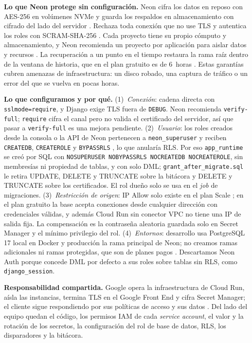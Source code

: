 \documentclass[10pt,letterpaper]{article}
\newcommand{\cod}[1]{\texttt{#1}}
\begin{document}
\textbf{Lo que Neon protege sin configuración.} Neon cifra los datos en reposo con AES-256 en volúmenes NVMe y guarda los respaldos en almacenamiento con cifrado del lado del servidor \cite{neon-security}. Rechaza toda conexión que no use TLS y autentica los roles con SCRAM-SHA-256 \cite{neon-connect}. Cada proyecto tiene su propio cómputo y almacenamiento, y Neon recomienda un proyecto por aplicación para aislar datos y recursos \cite{neon-plans}. La recuperación a un punto en el tiempo restaura la rama raíz dentro de la ventana de historia, que en el plan gratuito es de 6~horas \cite{neon-restore,neon-plans}. Estas garantías cubren amenazas de infraestructura: un disco robado, una captura de tráfico o un error del que se vuelva en pocas horas.

\textbf{Lo que configuramos y por qué.} (1)~\emph{Conexión}: cadena directa con \cod{sslmode=require}, y Django exige TLS fuera de \cod{DEBUG}. Neon recomienda \cod{verify-full}; \cod{require} cifra el canal pero no valida el certificado del servidor, así que pasar a \cod{verify-full} es una mejora pendiente. (2)~\emph{Usuario}: los roles creados desde la consola o la API de Neon pertenecen a \cod{neon\_superuser} y reciben \cod{CREATEDB}, \cod{CREATEROLE} y \cod{BYPASSRLS} \cite{neon-roles}, lo que anularía RLS. Por eso \cod{app\_runtime} se creó por SQL con \cod{NOSUPERUSER NOBYPASSRLS NOCREATEDB NOCREATEROLE}, sin membresías ni propiedad de tablas, y con solo DML; \cod{grant\_after\_migrate.sql} le retira UPDATE, DELETE y TRUNCATE sobre la bitácora y DELETE y TRUNCATE sobre los certificados. El rol dueño solo se usa en el \emph{job} de migraciones. (3)~\emph{Restricción de origen}: IP Allow solo existe en el plan Scale \cite{neon-ip}; en el plan gratuito la base acepta conexiones desde cualquier dirección con credenciales válidas, y además Cloud Run sin conector VPC no tiene una IP de salida fija. La compensación es la contraseña aleatoria guardada solo en Secret Manager y el mínimo privilegio del rol. (4)~\emph{Entornos}: desarrollo usa PostgreSQL 17 local en Docker y producción la rama principal de Neon; no creamos ramas adicionales ni ramas protegidas, que son de planes pagos \cite{neon-security}. Descartamos Neon Auth porque concede DML por defecto a sus roles sobre tablas sin RLS, como \cod{django\_session}.

\textbf{Responsabilidad compartida.} Google opera la infraestructura de Cloud Run, aísla las instancias, termina TLS en el Google Front End y cifra Secret Manager; el cliente sigue respondiendo por sus políticas de acceso y sus datos \cite{gcp-shared}. Del lado del equipo quedan el código, los permisos IAM de cada \emph{service account}, el valor y la rotación de los secretos, la configuración del rol de base de datos, RLS, los disparadores y la bitácora.
\end{document}
